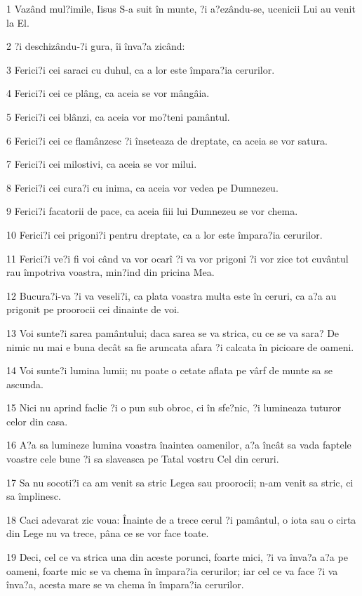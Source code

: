 \par 1 Vazând mul?imile, Iisus S-a suit în munte, ?i a?ezându-se, ucenicii Lui au venit la El.
\par 2 ?i deschizându-?i gura, îi înva?a zicând:
\par 3 Ferici?i cei saraci cu duhul, ca a lor este împara?ia cerurilor.
\par 4 Ferici?i cei ce plâng, ca aceia se vor mângâia.
\par 5 Ferici?i cei blânzi, ca aceia vor mo?teni pamântul.
\par 6 Ferici?i cei ce flamânzesc ?i înseteaza de dreptate, ca aceia se vor satura.
\par 7 Ferici?i cei milostivi, ca aceia se vor milui.
\par 8 Ferici?i cei cura?i cu inima, ca aceia vor vedea pe Dumnezeu.
\par 9 Ferici?i facatorii de pace, ca aceia fiii lui Dumnezeu se vor chema.
\par 10 Ferici?i cei prigoni?i pentru dreptate, ca a lor este împara?ia cerurilor.
\par 11 Ferici?i ve?i fi voi când va vor ocarî ?i va vor prigoni ?i vor zice tot cuvântul rau împotriva voastra, min?ind din pricina Mea.
\par 12 Bucura?i-va ?i va veseli?i, ca plata voastra multa este în ceruri, ca a?a au prigonit pe proorocii cei dinainte de voi.
\par 13 Voi sunte?i sarea pamântului; daca sarea se va strica, cu ce se va sara? De nimic nu mai e buna decât sa fie aruncata afara ?i calcata în picioare de oameni.
\par 14 Voi sunte?i lumina lumii; nu poate o cetate aflata pe vârf de munte sa se ascunda.
\par 15 Nici nu aprind faclie ?i o pun sub obroc, ci în sfe?nic, ?i lumineaza tuturor celor din casa.
\par 16 A?a sa lumineze lumina voastra înaintea oamenilor, a?a încât sa vada faptele voastre cele bune ?i sa slaveasca pe Tatal vostru Cel din ceruri.
\par 17 Sa nu socoti?i ca am venit sa stric Legea sau proorocii; n-am venit sa stric, ci sa împlinesc.
\par 18 Caci adevarat zic voua: Înainte de a trece cerul ?i pamântul, o iota sau o cirta din Lege nu va trece, pâna ce se vor face toate.
\par 19 Deci, cel ce va strica una din aceste porunci, foarte mici, ?i va înva?a a?a pe oameni, foarte mic se va chema în împara?ia cerurilor; iar cel ce va face ?i va înva?a, acesta mare se va chema în împara?ia cerurilor.
